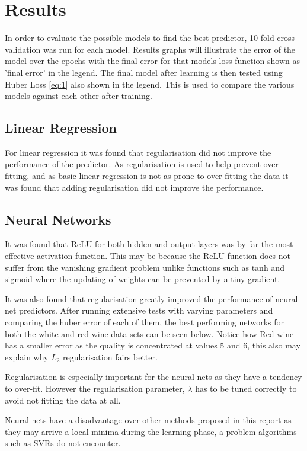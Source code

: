 \documentclass[10pt,twocolumn,letterpaper]{article}
\begin{document}
\section{Results}
In order to evaluate the possible models to find the best predictor, 10-fold cross validation was run for each model. Results graphs will illustrate the error of the model over the epochs with the final error for that models loss function shown as 'final error' in the legend. The final model after learning is then tested using Huber Loss \ref{eq:1} also shown in the legend. This is used to compare the various models against each other after training.

\subsection{Linear Regression}
For linear regression it was found that regularisation did not improve the performance of the predictor. As regularisation is used to help prevent over-fitting, and as basic linear regression is not as prone to over-fitting the data it was found that adding regularisation did not improve the performance.

\subsection{Neural Networks}
It was found that ReLU for both hidden and output layers was by far the most effective activation function. This may be because the ReLU function does not suffer from the vanishing gradient problem unlike functions such as tanh and sigmoid where the updating of weights can be prevented by a tiny gradient. 

It was also found that regularisation greatly improved the performance of neural net predictors. After running extensive tests with varying parameters and comparing the huber error of each of them, the best performing networks for both the white and red wine data sets can be seen below. Notice how Red wine has a smaller error as the quality is concentrated at values 5 and 6, this also may explain why $L_2$ regularisation fairs better.

Regularisation is especially important for the neural nets as they have a tendency to over-fit. However the regularisation parameter, $\lambda$ has to be tuned correctly to avoid not fitting the data at all.

Neural nets have a disadvantage over other methods proposed in this report as they may arrive a local minima during the learning phase, a problem algorithms such as SVRs do not encounter.
\end{document}
